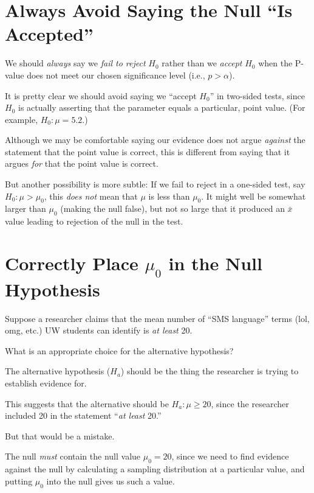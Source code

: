 \documentclass[
  letterpaper,
  DIV=11,
  numbers=noendperiod]{scrreprt}
\begin{document}
\section{Always Avoid Saying the Null ``Is
Accepted''}\label{always-avoid-saying-the-null-is-accepted}

We should \emph{always} say we \emph{fail to reject} \(H_0\) rather than
we \emph{accept} \(H_0\) when the P-value does not meet our chosen
significance level (i.e., \(p > \alpha\)).

It is pretty clear we should avoid saying we ``accept \(H_0\)'' in
two-sided tests, since \(H_0\) is actually asserting that the parameter
equals a particular, point value. (For example, \(H_0: \mu = 5.2\).)

Although we may be comfortable saying our evidence does not argue
\emph{against} the statement that the point value is correct, this is
different from saying that it argues \emph{for} that the point value is
correct.

But another possibility is more subtle: If we fail to reject in a
one-sided test, say \(H_0: \mu > \mu_0\), this \emph{does not} mean that
\(\mu\) is less than \(\mu_0\). It might well be somewhat larger than
\(\mu_0\) (making the null false), but not so large that it produced an
\(\bar{x}\) value leading to rejection of the null in the test.

\section{\texorpdfstring{Correctly Place \(\mu_0\) in the Null
Hypothesis}{Correctly Place \textbackslash mu\_0 in the Null Hypothesis}}\label{correctly-place-mu_0-in-the-null-hypothesis}

Suppose a researcher claims that the mean number of ``SMS language''
terms (lol, omg, etc.) UW students can identify is \emph{at least} 20.

What is an appropriate choice for the alternative hypothesis?

The alternative hypothesis (\(H_a\)) should be the thing the researcher
is trying to establish evidence for.

This suggests that the alternative should be \(H_a: \mu \geq 20\), since
the researcher included 20 in the statement ``\emph{at least} 20.''

But that would be a mistake.

The null \emph{must} contain the null value \(\mu_0 = 20\), since we
need to find evidence against the null by calculating a sampling
distribution at a particular value, and putting \(\mu_0\) into the null
gives us such a value.
\end{document}
